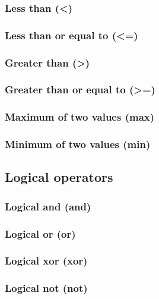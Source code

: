 \documentclass{article}
\theoremstyle{definition}
\begin{document}
\subsubsection{Less than (<)}

\subsubsection{Less than or equal to (<=)}

\subsubsection{Greater than (>)}

\subsubsection{Greater than or equal to (>=)}

\subsubsection{Maximum of two values (max)}

\subsubsection{Minimum of two values (min)}

\subsection{Logical operators}

\subsubsection{Logical and (and)}

\subsubsection{Logical or (or)}

\subsubsection{Logical xor (xor)}

\subsubsection{Logical not (not)}
\end{document}
